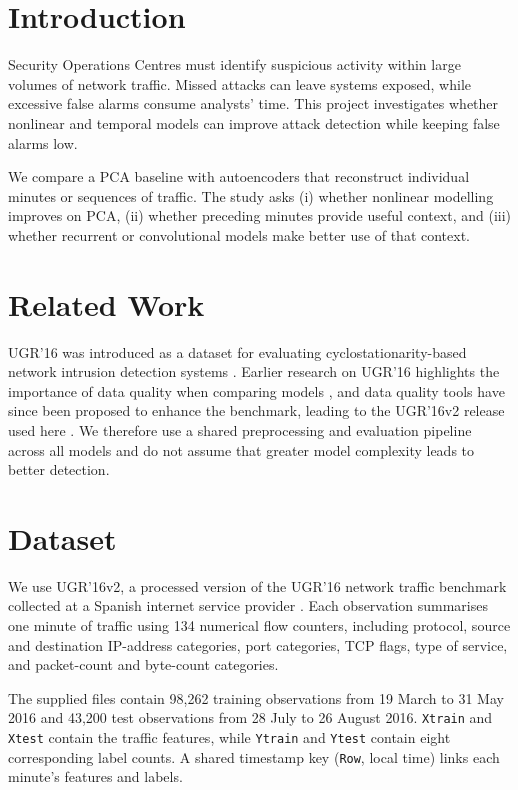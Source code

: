 \documentclass[conference]{IEEEtran}
\begin{document}
\section{Introduction}
Security Operations Centres must identify suspicious activity within large volumes of network traffic. Missed attacks can leave systems exposed, while excessive false alarms consume analysts' time. This project investigates whether nonlinear and temporal models can improve attack detection while keeping false alarms low.

We compare a PCA baseline with autoencoders that reconstruct individual minutes or sequences of traffic. The study asks (i) whether nonlinear modelling improves on PCA, (ii) whether preceding minutes provide useful context, and (iii) whether recurrent or convolutional models make better use of that context.

\section{Related Work}
UGR'16 was introduced as a dataset for evaluating cyclostationarity-based network intrusion detection systems \cite{macia2018}. Earlier research on UGR'16 highlights the importance of data quality when comparing models \cite{camacho2023}, and data quality tools have since been proposed to enhance the benchmark, leading to the UGR'16v2 release used here \cite{camacho2025}. We therefore use a shared preprocessing and evaluation pipeline across all models and do not assume that greater model complexity leads to better detection.

\section{Dataset}
We use UGR'16v2, a processed version of the UGR'16 network traffic benchmark collected at a Spanish internet service provider \cite{camacho2025,macia2018}. Each observation summarises one minute of traffic using 134 numerical flow counters, including protocol, source and destination IP-address categories, port categories, TCP flags, type of service, and packet-count and byte-count categories.

The supplied files contain 98,262 training observations from 19 March to 31 May 2016 and 43,200 test observations from 28 July to 26 August 2016. \texttt{Xtrain} and \texttt{Xtest} contain the traffic features, while \texttt{Ytrain} and \texttt{Ytest} contain eight corresponding label counts. A shared timestamp key (\texttt{Row}, local time) links each minute's features and labels.
\end{document}
